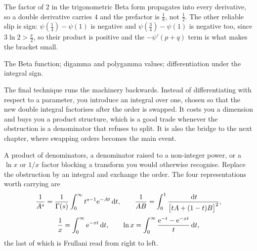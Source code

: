 \begin{trap}
The factor of $2$ in the trigonometric Beta form propagates into every derivative, so a double derivative carries $4$ and the prefactor is $\tfrac18$, not $\tfrac12$. The other reliable slip is sign: $\psi(\tfrac14)-\psi(1)$ is negative and $\psi(\tfrac34)-\psi(1)$ is negative too, since $3\ln2>\tfrac{\pi}{2}$, so their product is positive and the $-\psi'(p+q)$ term is what makes the bracket small.
\end{trap}

\begin{seealsob}The Beta function; digamma and polygamma values; differentiation under the integral sign.\end{seealsob}

The final technique runs the machinery backwards. Instead of differentiating with respect to a parameter, you introduce an integral over one, chosen so that the new double integral factorises after the order is swapped. It costs you a dimension and buys you a product structure, which is a good trade whenever the obstruction is a denominator that refuses to split. It is also the bridge to the next chapter, where swapping orders becomes the main event.

\cue A product of denominators, a denominator raised to a non-integer power, or a $\ln x$ or $1/x$ factor blocking a transform you would otherwise recognise.
\method Replace the obstruction by an integral and exchange the order. The four representations worth carrying are
\[\frac{1}{A^{s}}=\frac{1}{\Gamma(s)}\int_0^{\infty}t^{s-1}\mathrm{e}^{-At}\,\mathrm{d} t,\qquad \frac{1}{AB}=\int_0^1\frac{\,\mathrm{d} t}{\bigl[tA+(1-t)B\bigr]^{2}},\]
\[\frac1x=\int_0^{\infty}\mathrm{e}^{-xt}\,\mathrm{d} t,\qquad \ln x=\int_0^{\infty}\frac{\mathrm{e}^{-t}-\mathrm{e}^{-xt}}{t}\,\mathrm{d} t,\]
the last of which is Frullani read from right to left.

